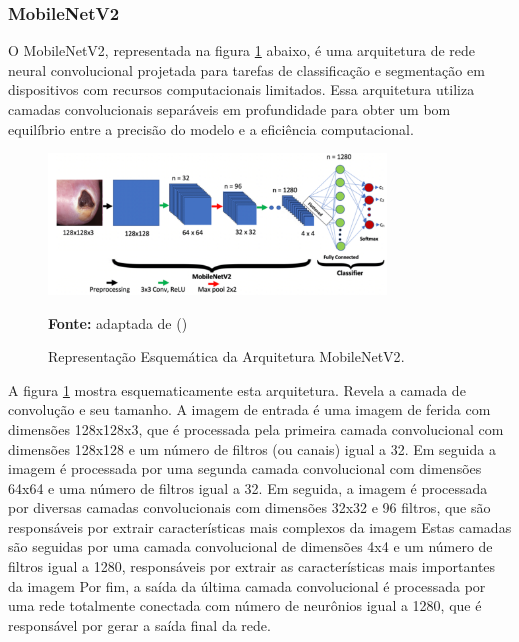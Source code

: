     \clearpage
    
    \subsubsection{MobileNetV2}

        O \ac{MobileNetV2}, representada na figura \ref{fig:arquiteturaMobileNetV2} abaixo, é uma arquitetura de rede neural convolucional projetada para tarefas de classificação e segmentação em dispositivos com recursos computacionais limitados. Essa arquitetura utiliza camadas convolucionais separáveis em profundidade para obter um bom equilíbrio entre a precisão do modelo e a eficiência computacional.
    
            \begin{figure}[htbp]
                \centering
                \caption{Representação Esquemática da Arquitetura \ac{MobileNetV2}.}
                \includegraphics[width=0.8\textwidth]{img/arquitetura_MobileNetV2.png}
                \label{fig:arquiteturaMobileNetV2}
                \par\medskip\textbf{Fonte:} adaptada de (\cite{akay2021deep})
            \end{figure}   
    
        A figura \ref{fig:arquiteturaMobileNetV2} mostra esquematicamente esta arquitetura. Revela a camada de convolução e seu tamanho. A imagem de entrada é uma imagem de ferida com dimensões 128x128x3, que é processada pela primeira camada convolucional com dimensões 128x128 e um número de filtros (ou canais) igual a 32. Em seguida a imagem é processada por uma segunda camada convolucional com dimensões 64x64 e uma número de filtros igual a 32. Em seguida, a imagem é processada por diversas camadas convolucionais com dimensões 32x32 e 96 filtros, que são responsáveis por extrair características mais complexos da imagem Estas camadas são seguidas por uma camada convolucional de dimensões 4x4 e um número de filtros igual a 1280, responsáveis por extrair as características mais importantes da imagem Por fim, a saída da última camada convolucional é processada por uma rede totalmente conectada com número de neurônios igual a 1280, que é responsável por gerar a saída final da rede.

